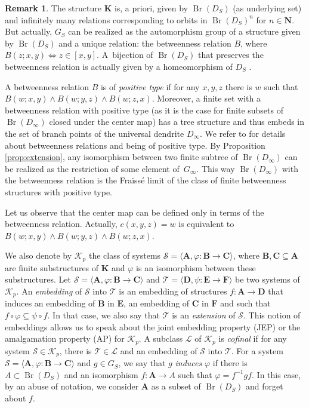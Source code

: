 \documentclass[JEP,XML,SOM,Unicode,NoFloatCountersInSection]{cedram}
\let\mathcal\mathscr
\theoremstyle{plain}
\theoremstyle{definition}
\newtheorem{rem}[thm]{Remark}
\newcommand{\bA}{{\boldsymbol{A}}}
\newcommand{\bB}{{\boldsymbol{B}}}
\newcommand{\bC}{{\boldsymbol{C}}}
\newcommand{\bD}{{\boldsymbol{D}}}
\newcommand{\bE}{{\boldsymbol{E}}}
\newcommand{\bF}{{\boldsymbol{F}}}
\newcommand{\bK}{{\boldsymbol{K}}}
\newcommand{\NN}{\mathbf{N}}
\newcommand{\cK}{\mathcal{K}}
\newcommand{\cL}{\mathcal{L}}
\newcommand{\cS}{\mathcal{S}}
\newcommand{\cT}{\mathcal{T}}
\DeclareMathOperator{\Br}{Br}
\begin{document}
\begin{rem}\label{structure} The structure $\bK$ is, a priori, given by $\Br(D_S)$ (as underlying set) and infinitely many relations corresponding to orbits in $\Br(D_S)^n$ for $n\in\NN$. But actually, $G_S$ can be realized as the automorphism group of a structure given by $\Br(D_S)$ and a unique relation: the betweenness relation $B$, where $B(z;x,y)\Leftrightarrow z\in[x,y]$. A~bijection of $\Br(D_S)$ that preserves the betweenness relation is actually given by a homeomorphism of $D_S$ \cite[Prop.\,2.4]{DMW}.

A betweenness relation $B$ is of \emph{positive type} if for any $x,y,z$ there is $w$ such that $B(w;x,y)\wedge B(w;y,z)\wedge B(w;z,x)$. Moreover, a finite set with a betweenness relation with positive type (as it is the case for finite subsets of $\Br(D_\infty)$ closed under the center map) has a tree structure \cite[Lem.\,29.1]{MR1388893} and thus embeds in the set of branch points of the universal dendrite $D_\infty$. We refer to \cite{MR1388893} for details about betweenness relations and being of positive type. By Proposition \ref{prop:extension}, any isomorphism between two finite subtree of $\Br(D_\infty)$ can be realized as the restriction of some element of~$G_\infty$. This way $\Br(D_\infty)$ with the betweenness relation is the Fraïssé limit of the class of finite betweenness structures with positive type.

Let us observe that the center map can be defined only in terms of the betweenness relation. Actually, $c(x,y,z)=w$ is equivalent to $B(w;x,y)\wedge B(w;y,z)\wedge B(w;z,x)$.\end{rem}

We also denote by $\cK_p$ the class of systems $\cS=\langle \bA,\varphi\colon\bB\to\bC\rangle$, where $\bB,\bC\subseteq \bA$ are finite substructures of $\bK$ and $\varphi$ is an isomorphism between these substructures. Let $\cS=\langle \bA,\varphi\colon\bB\to\bC\rangle$ and $\cT=\langle \bD,\psi\colon\bE\to\bF\rangle$ be two systems of $\cK_p$. An \emph{embedding} of $\cS$ into $\cT$ is an embedding of structures $f\colon \bA\to\bD$ that induces an embedding of $\bB$ in $\bE$, an embedding of $\bC$ in $\bF$ and such that $f\circ\varphi\subseteq \psi\circ f$. In that case, we also say that $\cT$ is an \emph{extension} of $\cS$. This notion of embeddings allows us to speak about the joint embedding property (JEP) or the amalgamation property (AP) for $\cK_p$. A subclass $\cL$ of $\cK_p$ is \emph{cofinal} if for any system $\cS\in\cK_p$, there is $\cT\in\cL$ and an embedding of $\cS$ into $\cT$.
For a system $\cS=\langle \bA,\varphi\colon\bB\to\bC\rangle$ and $g\in G_S$, we say that $g$ \emph{induces} $\varphi$ if there is $A\subset \Br(D_S)$ and an isomorphism $f\colon \bA\to A$ such that $\varphi=f^{-1}gf$. In this case, by an abuse of notation, we consider $\bA$ as a subset of $\Br(D_S)$ and forget about $f$.
\end{document}
